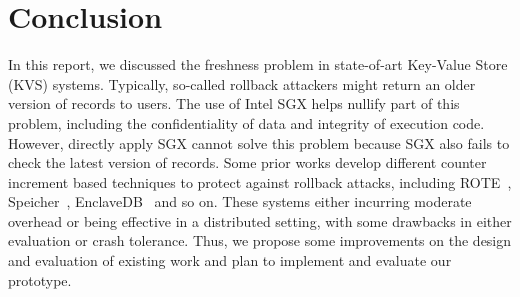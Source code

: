 \section{Conclusion}
In this report, we discussed the freshness problem in state-of-art Key-Value Store (KVS) 
systems. Typically, so-called rollback attackers might return an older version of records 
to users. The use of Intel SGX helps nullify part of this problem, including the 
confidentiality of data and integrity of execution code. However, directly apply SGX
cannot solve this problem because SGX also fails to check the latest version of records. 
Some prior works develop different counter increment based techniques to protect against
rollback attacks, including ROTE~\cite{}, Speicher~\cite{}, EnclaveDB~\cite{} and so on.
These systems either incurring moderate overhead or being effective in a distributed setting,
with some drawbacks in either evaluation or crash tolerance. 
Thus, we propose some improvements on the design and evaluation of existing work and plan 
to implement and evaluate our prototype.